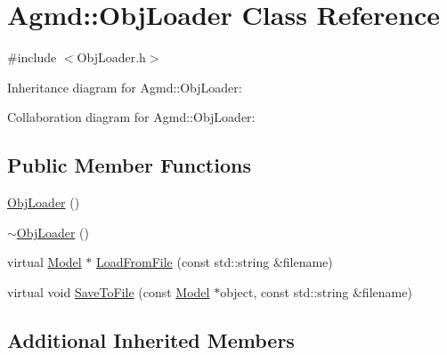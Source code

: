 \hypertarget{class_agmd_1_1_obj_loader}{\section{Agmd\+:\+:Obj\+Loader Class Reference}
\label{class_agmd_1_1_obj_loader}
}


{\ttfamily \#include $<$Obj\+Loader.\+h$>$}



Inheritance diagram for Agmd\+:\+:Obj\+Loader\+:


Collaboration diagram for Agmd\+:\+:Obj\+Loader\+:
\subsection*{Public Member Functions}
\begin{DoxyCompactItemize}
\item 
\hyperlink{class_agmd_1_1_obj_loader_a13f50dd3ad123f69f6c7f74ceb02e3ec}{Obj\+Loader} ()
\item 
\hyperlink{class_agmd_1_1_obj_loader_ad0a2eae80661ec79713ca1a5d9208f1c}{$\sim$\+Obj\+Loader} ()
\item 
virtual \hyperlink{class_agmd_1_1_model}{Model} $\ast$ \hyperlink{class_agmd_1_1_obj_loader_a2834d6c2ff1020a6154baf54eff330f2}{Load\+From\+File} (const std\+::string \&filename)
\item 
virtual void \hyperlink{class_agmd_1_1_obj_loader_a011e55fd1ad12a4e42d9e6ee845ef034}{Save\+To\+File} (const \hyperlink{class_agmd_1_1_model}{Model} $\ast$object, const std\+::string \&filename)
\end{DoxyCompactItemize}
\subsection*{Additional Inherited Members}


